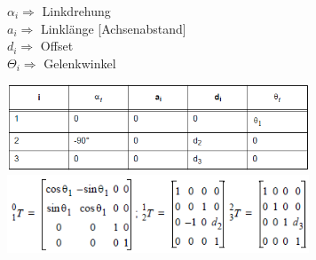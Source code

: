 \begin{minipage}{6cm}
    $\alpha_{i} \Longrightarrow $ Linkdrehung  \\
    $ a_{i} \Longrightarrow $ Linklänge [Achsenabstand] \\
    $ d_{i} \Longrightarrow $ Offset \\
    $ \Theta_{i} \Longrightarrow $ Gelenkwinkel \\ 
\end{minipage}
\begin{minipage}{8cm} 
    \includegraphics[width=9cm]{./bilder/denavittabelle} \\
    \includegraphics[width=9cm]{./bilder/denavitmatrix} \\
\end{minipage} \\